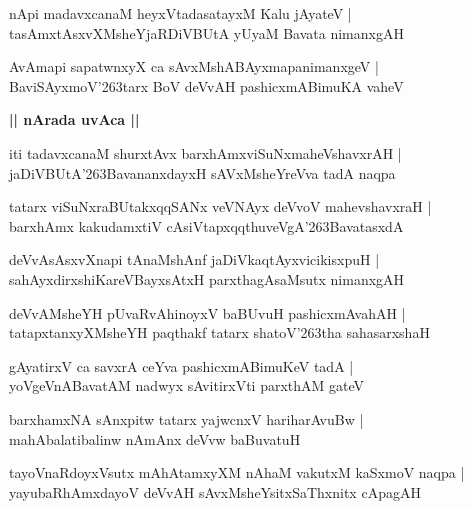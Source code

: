 \documentclass[twoside,12pt,openright]{book}
\def\S{\char'263}
\newcounter{shloka}[chapter]
\def\uvaca#1{\centerline{{\large\textbf{#1}}}}
\begin{document}
\begin{shloka}%
nApi madavxcanaM heyxVtadasatayxM Kalu jAyateV |\\
tasAmxtAsxvXMsheYjaRDiVBUtA yUyaM Bavata nimanxgAH 
\end{shloka}

\begin{shloka}%
AvAmapi sapatwnxyX ca sAvxMshABAyxmapanimanxgeV |\\
BaviSAyxmoV\S tarx BoV deVvAH pashicxmABimuKA vaheV 
\end{shloka}

\uvaca{|| nArada uvAca ||}

\begin{shloka}%
iti tadavxcanaM shurxtAvx barxhAmxviSuNxmaheVshavxrAH |\\
jaDiVBUtA\S BavananxdayxH sAVxMsheYreVva tadA naqpa 
\end{shloka}

\begin{shloka}%
tatarx viSuNxraBUtakxqqSANx veVNAyx deVvoV mahevshavxraH |\\
barxhAmx kakudamxtiV cAsiVtapxqqthuveVgA\S BavatasxdA 
\end{shloka}

\begin{shloka}%
deVvAsAsxvXnapi tAnaMshAnf jaDiVkaqtAyxvicikisxpuH |\\
sahAyxdirxshiKareVBayxsAtxH parxthagAsaMsutx nimanxgAH 
\end{shloka}

\begin{shloka}%
deVvAMsheYH pUvaRvAhinoyxV baBUvuH pashicxmAvahAH |\\
tatapxtanxyXMsheYH paqthakf tatarx shatoV\S tha sahasarxshaH 
\end{shloka}

\begin{shloka}%
gAyatirxV ca savxrA ceYva pashicxmABimuKeV tadA |\\
yoVgeVnABavatAM nadwyx sAvitirxVti parxthAM gateV 
\end{shloka}

\begin{shloka}%
barxhamxNA sAnxpitw tatarx yajwcnxV hariharAvuBw |\\
mahAbalatibalinw nAmAnx deVvw baBuvatuH 
\end{shloka}

\begin{shloka}%
tayoVnaRdoyxVsutx mAhAtamxyXM nAhaM vakutxM kaSxmoV naqpa |\\
yayubaRhAmxdayoV deVvAH sAvxMsheYsitxSaThxnitx cApagAH
\end{shloka}
\end{document}
